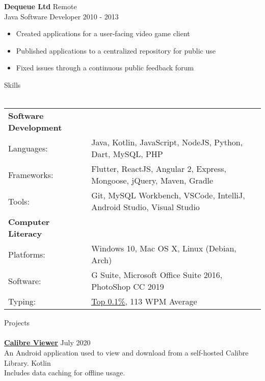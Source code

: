 \documentclass[a4paper]{article}
\newcommand{\lineunder} {
    \vspace*{-8pt} \\
    \hspace*{-18pt} \hrulefill \\
}
\newcommand{\header} [1] {
    {\hspace*{-18pt}\vspace*{6pt} {#1}}
    \vspace*{-6pt} \lineunder
}
\newcommand{\subheader} [1] {
    \hspace{2pt}
    \textbf{
        {\hspace*{-18pt}\vspace*{6pt} {#1}}
        \vspace*{-6pt}
    }
    \\
}
\begin{document}
\vspace{-2mm}

\textbf{Dequeue Ltd} \hfill Remote\\
Java Software Developer \hfill 2010 - 2013\\
\vspace{-2.5mm}
\begin{itemize} \itemsep 1pt
    \item Created applications for a user-facing video game client
    \vspace{-1mm}
	\item Published applications to a centralized repository for public use
	\vspace{-1mm}
	\item Fixed issues through a continuous public feedback forum
\end{itemize}

\header{Skills}
\vspace{2mm}
\begin{tabular}{ l l }
    \subheader{Software Development}
    \hspace{-3mm}
	Languages:      & Java, Kotlin, JavaScript, NodeJS, Python, Dart, MySQL, PHP    \\
    \hspace{-3mm}
	Frameworks:     & Flutter, ReactJS, Angular 2, Express, Mongoose, jQuery, Maven, Gradle \\
    \hspace{-3mm}
	Tools:          & Git, MySQL Workbench, VSCode, IntelliJ, Android Studio, Visual Studio
	\vspace{1mm}\\
    \subheader{Computer Literacy}
    \hspace{-3mm}
	Platforms:  & Windows 10, Mac OS X, Linux (Debian, Arch) \\
    \hspace{-3mm}
	Software:   & G Suite, Microsoft Office Suite 2016, PhotoShop CC 2019  \\
    \hspace{-3mm}
	Typing:     & \href{https://data.typeracer.com/misc/badge?user=tsedlar}{\ul{Top 0.1\%}}, 113 WPM Average \\
\end{tabular}
\vspace*{2mm}

\header{Projects}

{\textbf{\href{https://github.com/TSedlar/CalibreViewer}{\ul{Calibre Viewer}}}} \hfill July 2020 \\
\vspace*{1mm}
An Android application used to view and download from a self-hosted Calibre Library. \hfill Kotlin \\ Includes data caching for offline usage. \\
\vspace*{1mm}
\end{document}
